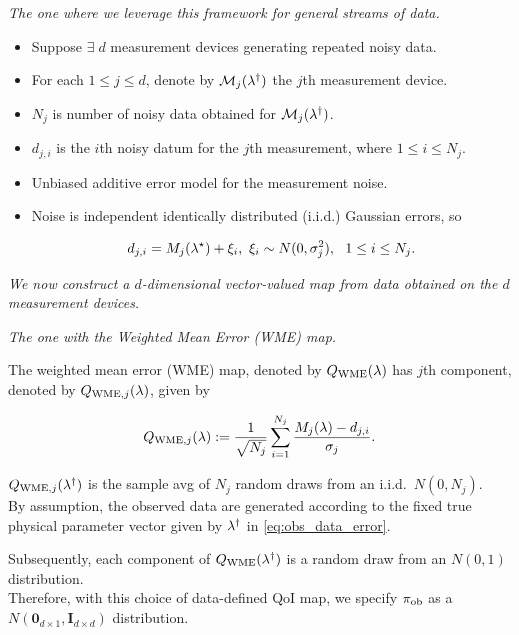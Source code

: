\begin{frame}[t]{\it The one where we leverage this framework for general streams of data.}

\begin{itemize}
  \item Suppose $\exists \; d$ measurement devices generating repeated noisy data.

  \bigskip
  \item For each $1\leq j\leq d$, denote by $\mathcal{M}_j(\lambda^\dagger)$ the $j$th measurement device.

  \bigskip
  \item $N_j$ is number of noisy data obtained for $\mathcal{M}_j(\lambda^\dagger)$.
  \item $d_{j,i}$ is the $i$th noisy datum for the $j$th measurement, where $1\leq i\leq N_j$.

  \bigskip
  \item Unbiased additive error model for the measurement noise.
  \item Noise is independent identically distributed (i.i.d.) Gaussian errors, so

  \begin{equation}\label{eq:obs_data_error}
  	d_{j,i} = M_j(\param^\star) + \xi_i, \ \xi_i\sim N(0,\sigma_j^2), \ \ 1\leq i\leq N_j.
  \end{equation}

\end{itemize}

\bigskip
\bigskip
\centering
{\it We now construct a $d$-dimensional vector-valued map from data obtained on the $d$ measurement devices.}

\end{frame}


\begin{frame}{\it The one with the Weighted Mean Error (WME) map.}


The weighted mean error (WME) map, denoted by $Q_\text{WME}(\lambda)$ has $j$th component, denoted by $Q_{\text{WME},j}(\lambda)$, given by

\begin{equation}\label{eq:qoi_WME}
	Q_{\text{WME},j}(\lambda) := \frac{1}{\sqrt{N_j}} \sum_{i=1}^{N_j} \frac{M_j(\lambda)-d_{j,i}}{\sigma_j}.
\end{equation}

\vskip 12pt
$Q_{\text{WME},j}(\lambda^\dagger)$ is the sample avg of $N_j$ random draws from an i.i.d.~$N(0,N_j)$.\\
By assumption, the observed data are generated according to the fixed true physical parameter vector given by $\lambda^\dagger$ in \eqref{eq:obs_data_error}.

\vskip 12pt
Subsequently, each component of $Q_\text{WME}(\lambda^\dagger)$ is a random draw from an $N(0,1)$ distribution.\\
Therefore, with this choice of data-defined QoI map, we specify $\operatorname*{\pi_{ob}}$ as a $N(\mathbf{0}_{d\times 1},\mathbf{I}_{d\times d})$ distribution.

\end{frame}

